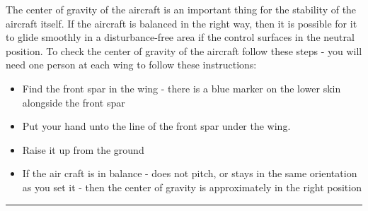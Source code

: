 	The center of gravity of the aircraft is an important thing for the
	stability of the aircraft itself. If the aircraft is balanced in the
	right way, then it is possible for it to glide smoothly in a
	disturbance-free area if the control surfaces in the neutral position.
	To check the center of gravity of the aircraft follow these steps - you
	will need one person at each wing to follow these instructions:
	
	\begin{itemize}
	\itemsep1pt\parskip0pt
	\item
	  Find the front spar in the wing - there is a blue marker on the lower
	  skin alongside the front spar
	\item
	  Put your hand unto the line of the front spar under the wing.
	\item
	  Raise it up from the ground
	\item
	  If the air craft is in balance - does not pitch, or stays in the same
	  orientation as you set it - then the center of gravity is
	  approximately in the right position
	\end{itemize}
	
	\begin{center}\rule{3in}{0.4pt}\end{center}
	


